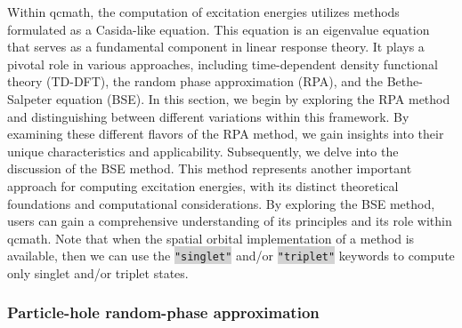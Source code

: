 \documentclass[aip,jcp,reprint,noshowkeys,superscriptaddress]{revtex4-1}
\newcommand{\keyword}[1]{{\colorbox{lightgray}{\texttt{#1}}}}
\begin{document}
Within qcmath, the computation of excitation energies utilizes methods formulated as a Casida-like equation.\cite{Casida_2005} This equation is an eigenvalue equation that serves as a fundamental component in linear response theory. It plays a pivotal role in various approaches, including time-dependent density functional theory (TD-DFT), \cite{UlrichBook} the random phase approximation (RPA), and the Bethe-Salpeter equation (BSE). \cite{MartinBook}
In this section, we begin by exploring the RPA method and distinguishing between different variations within this framework. By examining these different flavors of the RPA method, we gain insights into their unique characteristics and applicability.
Subsequently, we delve into the discussion of the BSE method. This method represents another important approach for computing excitation energies, with its distinct theoretical foundations and computational considerations. By exploring the BSE method, users can gain a comprehensive understanding of its principles and its role within qcmath. Note that when the spatial orbital implementation of a method is available, then we can use the \keyword{"singlet"} and/or \keyword{"triplet"} keywords to compute only singlet and/or triplet states.

\subsubsection*{Particle-hole random-phase approximation}
\label{subsec:ph-RPA}
\end{document}
